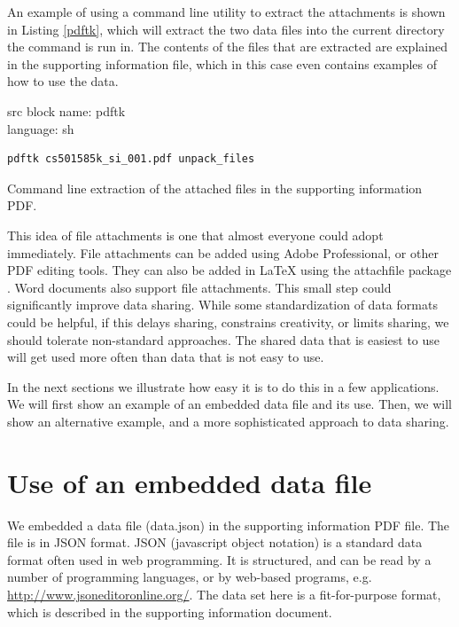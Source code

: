 \documentclass[journal=accacs,manuscript=article,email=true]{achemso}
\begin{document}
An example of using a command line utility to extract the attachments is shown in Listing \ref{pdftk}, which will extract the two data files into the current directory the command is run in. The contents of the files that are extracted are explained in the supporting information file, which in this case even contains examples of how to use the data.

\begin{tcolorbox}
src block name: pdftk\\language: sh\begin{listing}[H]
\begin{verbatim}
pdftk cs501585k_si_001.pdf unpack_files
\end{verbatim}
\caption{\label{pdftk}Command line extraction of the attached files in the supporting information PDF.}
\end{listing}
\end{tcolorbox}

This idea of file attachments is one that almost everyone could adopt immediately. File attachments can be added using Adobe Professional, or other PDF editing tools. They can also be added in \LaTeX{} using the attachfile package \cite{pakin-attachfile}. Word documents also support file attachments. This small step could significantly improve data sharing. While some standardization of data formats could be helpful, if this delays sharing, constrains creativity, or limits sharing, we should tolerate non-standard approaches. The shared data that is easiest to use will get used more often than data that is not easy to use.

In the next sections we illustrate how easy it is to do this in a few applications. We will first show an example of an embedded data file and its use. Then, we will show an alternative example, and a more sophisticated approach to data sharing.

\section{Use of an embedded data file}
\label{sec-2}
We embedded a data file (data.json) in the supporting information PDF file. The file is in JSON format. JSON (javascript object notation) is a standard data format often used in web programming. It is structured, and can be read by a number of programming languages, or by web-based programs, e.g.  \url{http://www.jsoneditoronline.org/}. The data set here is a fit-for-purpose format, which is described in the supporting information document.
\end{document}
